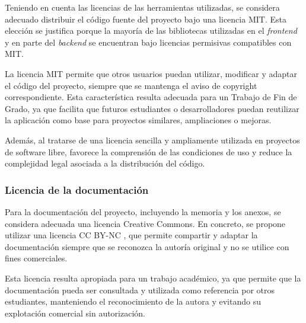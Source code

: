 Teniendo en cuenta las licencias de las herramientas utilizadas, se considera adecuado distribuir el código fuente del proyecto bajo una licencia MIT. Esta elección se justifica porque la mayoría de las bibliotecas utilizadas en el \textit{frontend} y en parte del \textit{backend} se encuentran bajo licencias permisivas compatibles con MIT.

La licencia MIT permite que otros usuarios puedan utilizar, modificar y adaptar el código del proyecto, siempre que se mantenga el aviso de copyright correspondiente. Esta característica resulta adecuada para un Trabajo de Fin de Grado, ya que facilita que futuros estudiantes o desarrolladores puedan reutilizar la aplicación como base para proyectos similares, ampliaciones o mejoras.

Además, al tratarse de una licencia sencilla y ampliamente utilizada en proyectos de software libre, favorece la comprensión de las condiciones de uso y reduce la complejidad legal asociada a la distribución del código.

\subsubsection{Licencia de la documentación}

Para la documentación del proyecto, incluyendo la memoria y los anexos, se considera adecuada una licencia Creative Commons. En concreto, se propone utilizar una licencia CC BY-NC , que permite compartir y adaptar la documentación siempre que se reconozca la autoría original y no se utilice con fines comerciales.

Esta licencia resulta apropiada para un trabajo académico, ya que permite que la documentación pueda ser consultada y utilizada como referencia por otros estudiantes, manteniendo el reconocimiento de la autora y evitando su explotación comercial sin autorización.


